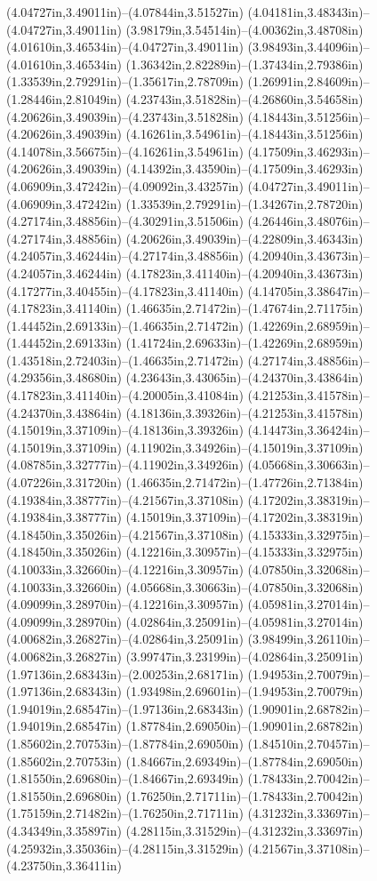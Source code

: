 (4.04727in,3.49011in)--(4.07844in,3.51527in) (4.04181in,3.48343in)--(4.04727in,3.49011in) (3.98179in,3.54514in)--(4.00362in,3.48708in) (4.01610in,3.46534in)--(4.04727in,3.49011in) (3.98493in,3.44096in)--(4.01610in,3.46534in) (1.36342in,2.82289in)--(1.37434in,2.79386in) (1.33539in,2.79291in)--(1.35617in,2.78709in) (1.26991in,2.84609in)--(1.28446in,2.81049in) (4.23743in,3.51828in)--(4.26860in,3.54658in) (4.20626in,3.49039in)--(4.23743in,3.51828in) (4.18443in,3.51256in)--(4.20626in,3.49039in) (4.16261in,3.54961in)--(4.18443in,3.51256in) (4.14078in,3.56675in)--(4.16261in,3.54961in) (4.17509in,3.46293in)--(4.20626in,3.49039in) (4.14392in,3.43590in)--(4.17509in,3.46293in) (4.06909in,3.47242in)--(4.09092in,3.43257in) (4.04727in,3.49011in)--(4.06909in,3.47242in) (1.33539in,2.79291in)--(1.34267in,2.78720in) (4.27174in,3.48856in)--(4.30291in,3.51506in) (4.26446in,3.48076in)--(4.27174in,3.48856in) (4.20626in,3.49039in)--(4.22809in,3.46343in) (4.24057in,3.46244in)--(4.27174in,3.48856in) (4.20940in,3.43673in)--(4.24057in,3.46244in) (4.17823in,3.41140in)--(4.20940in,3.43673in) (4.17277in,3.40455in)--(4.17823in,3.41140in) (4.14705in,3.38647in)--(4.17823in,3.41140in) (1.46635in,2.71472in)--(1.47674in,2.71175in) (1.44452in,2.69133in)--(1.46635in,2.71472in) (1.42269in,2.68959in)--(1.44452in,2.69133in) (1.41724in,2.69633in)--(1.42269in,2.68959in) (1.43518in,2.72403in)--(1.46635in,2.71472in) (4.27174in,3.48856in)--(4.29356in,3.48680in) (4.23643in,3.43065in)--(4.24370in,3.43864in) (4.17823in,3.41140in)--(4.20005in,3.41084in) (4.21253in,3.41578in)--(4.24370in,3.43864in) (4.18136in,3.39326in)--(4.21253in,3.41578in) (4.15019in,3.37109in)--(4.18136in,3.39326in) (4.14473in,3.36424in)--(4.15019in,3.37109in) (4.11902in,3.34926in)--(4.15019in,3.37109in) (4.08785in,3.32777in)--(4.11902in,3.34926in) (4.05668in,3.30663in)--(4.07226in,3.31720in) (1.46635in,2.71472in)--(1.47726in,2.71384in) (4.19384in,3.38777in)--(4.21567in,3.37108in) (4.17202in,3.38319in)--(4.19384in,3.38777in) (4.15019in,3.37109in)--(4.17202in,3.38319in) (4.18450in,3.35026in)--(4.21567in,3.37108in) (4.15333in,3.32975in)--(4.18450in,3.35026in) (4.12216in,3.30957in)--(4.15333in,3.32975in) (4.10033in,3.32660in)--(4.12216in,3.30957in) (4.07850in,3.32068in)--(4.10033in,3.32660in) (4.05668in,3.30663in)--(4.07850in,3.32068in) (4.09099in,3.28970in)--(4.12216in,3.30957in) (4.05981in,3.27014in)--(4.09099in,3.28970in) (4.02864in,3.25091in)--(4.05981in,3.27014in) (4.00682in,3.26827in)--(4.02864in,3.25091in) (3.98499in,3.26110in)--(4.00682in,3.26827in) (3.99747in,3.23199in)--(4.02864in,3.25091in) (1.97136in,2.68343in)--(2.00253in,2.68171in) (1.94953in,2.70079in)--(1.97136in,2.68343in) (1.93498in,2.69601in)--(1.94953in,2.70079in) (1.94019in,2.68547in)--(1.97136in,2.68343in) (1.90901in,2.68782in)--(1.94019in,2.68547in) (1.87784in,2.69050in)--(1.90901in,2.68782in) (1.85602in,2.70753in)--(1.87784in,2.69050in) (1.84510in,2.70457in)--(1.85602in,2.70753in) (1.84667in,2.69349in)--(1.87784in,2.69050in) (1.81550in,2.69680in)--(1.84667in,2.69349in) (1.78433in,2.70042in)--(1.81550in,2.69680in) (1.76250in,2.71711in)--(1.78433in,2.70042in) (1.75159in,2.71482in)--(1.76250in,2.71711in) (4.31232in,3.33697in)--(4.34349in,3.35897in) (4.28115in,3.31529in)--(4.31232in,3.33697in) (4.25932in,3.35036in)--(4.28115in,3.31529in) (4.21567in,3.37108in)--(4.23750in,3.36411in) 